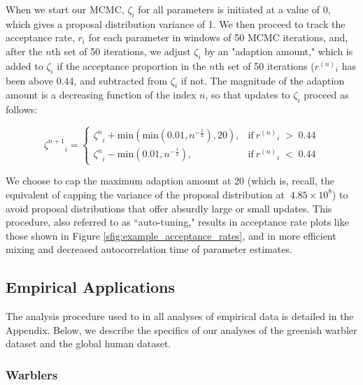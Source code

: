\documentclass[12pt]{article}
\begin{document}
When we start our MCMC, $\zeta_i$ for all parameters is initiated at a value of 0, which gives a proposal distribution variance of 1.  We then proceed to track the acceptance rate, $r_i$ for each parameter in windows of 50 MCMC iterations, and, after the $n$th set of 50 iterations, we adjust $\zeta_i$ by an "adaption amount," which is added to $\zeta_i$ if the acceptance proportion in the $n$th set of 50 iterations (${r^{(n)}}_i$ has been above 0.44, and subtracted from $\zeta_i$ if not.  The magnitude of the adaption amount is a decreasing function of the index $n$, so that updates to $\zeta_i$ proceed as follows:

\begin{equation}
{\zeta^{n+1}}_i =
\begin{cases}
{\zeta^{n}}_i + \text{min}(\text{min}(0.01,n^{-\frac{1}{2}}),20), & \text{if} \: {r^{(n)}}_i \; > \; 0.44 \\
{\zeta^{n}}_i - \text{min}(0.01,n^{-\frac{1}{2}}), & \text{if} \: {r^{(n)}}_i \; < \; 0.44
\end{cases}
\label{eq:adpative_mcmc}
\end{equation}

We choose to cap the maximum adaption amount at 20 (which is, recall, the equivalent of capping the variance of the proposal distribution at $~4.85 \times 10^8$) to avoid proposal distributions that offer absurdly large or small updates.  This procedure, also referred to as ``auto-tuning," results in acceptance rate plots like those shown in Figure \ref{sfig:example_acceptance_rates}, and in more efficient mixing and decreased autocorrelation time of parameter estimates.


\subsection*{Empirical Applications}
The analysis procedure used to in all analyses of empirical data is detailed in the Appendix.  Below, we describe the specifics of our analyses of the greenish warbler dataset and the global human dataset.  

\subsubsection*{Warblers}
\end{document}
